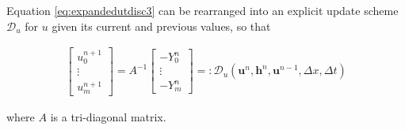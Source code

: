 \documentclass[times]{elsarticle}
\begin{document}
 Equation \eqref{eq:expandedutdisc3} can be rearranged into an explicit update scheme $\mathcal{D}_u$ for $u$ given its current and previous values, so that
\begin{linenomath*}
	\begin{gather}
	\left[\begin{array}{c}
	u^{n+1}_0 \\
	\vdots \\
	u^{n+1}_m \end{array}\right]
	= A^{-1} \left[\begin{array}{c}
	-Y^n_0 \\
	\vdots \\
	-Y^n_m \end{array}\right] =: \mathcal{D}_u\left(\boldsymbol{u}^n,\boldsymbol{h}^n, \boldsymbol{u}^{n-1}, \Delta x, \Delta t \right)
	\label{eq:FDcentforu}
	\end{gather}
\end{linenomath*}
where $A$ is a tri-diagonal matrix.
\end{document}

